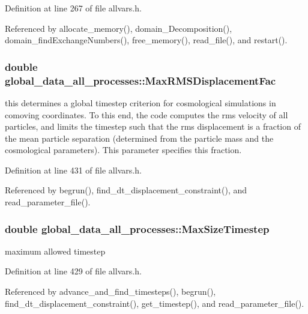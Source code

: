 Definition at line 267 of file allvars.h.



Referenced by allocate\_\-memory(), domain\_\-Decomposition(), domain\_\-findExchangeNumbers(), free\_\-memory(), read\_\-file(), and restart().

\hypertarget{structglobal__data__all__processes_a988ecf1fcfe5e61ff9ac29792c816c24}{
\subsubsection[{MaxRMSDisplacementFac}]{\setlength{\rightskip}{0pt plus 5cm}double {\bf global\_\-data\_\-all\_\-processes::MaxRMSDisplacementFac}}}
\label{structglobal__data__all__processes_a988ecf1fcfe5e61ff9ac29792c816c24}
this determines a global timestep criterion for cosmological simulations in comoving coordinates. To this end, the code computes the rms velocity of all particles, and limits the timestep such that the rms displacement is a fraction of the mean particle separation (determined from the particle mass and the cosmological parameters). This parameter specifies this fraction. 

Definition at line 431 of file allvars.h.



Referenced by begrun(), find\_\-dt\_\-displacement\_\-constraint(), and read\_\-parameter\_\-file().

\hypertarget{structglobal__data__all__processes_a7303c9f6c34ee3befcac84043c8ec3ea}{
\subsubsection[{MaxSizeTimestep}]{\setlength{\rightskip}{0pt plus 5cm}double {\bf global\_\-data\_\-all\_\-processes::MaxSizeTimestep}}}
\label{structglobal__data__all__processes_a7303c9f6c34ee3befcac84043c8ec3ea}
maximum allowed timestep 

Definition at line 429 of file allvars.h.



Referenced by advance\_\-and\_\-find\_\-timesteps(), begrun(), find\_\-dt\_\-displacement\_\-constraint(), get\_\-timestep(), and read\_\-parameter\_\-file().

